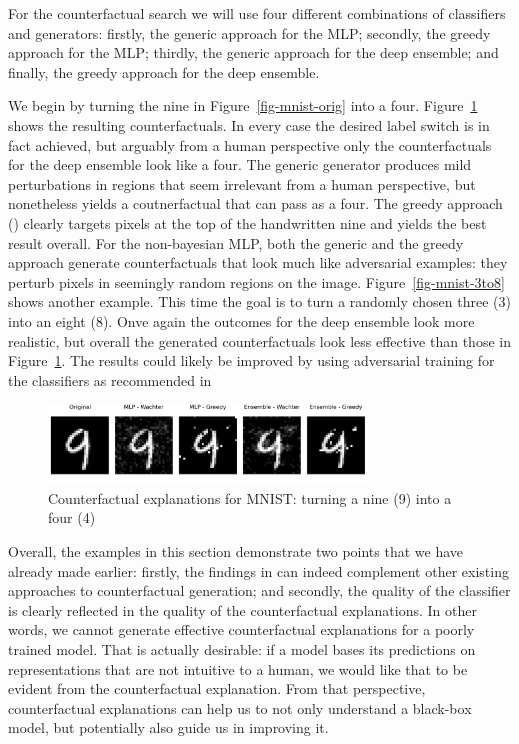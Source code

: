\documentclass{juliacon}
\begin{document}
For the counterfactual search we will use four different combinations of
classifiers and generators: firstly, the generic approach for the MLP;
secondly, the greedy approach for the MLP; thirdly, the generic approach
for the deep ensemble; and finally, the greedy approach for the deep
ensemble.

We begin by turning the nine in Figure~\ref{fig-mnist-orig} into a four.
Figure~\ref{fig-mnist-9to4} shows the resulting counterfactuals. In
every case the desired label switch is in fact achieved, but arguably
from a human perspective only the counterfactuals for the deep ensemble
look like a four. The generic generator produces mild perturbations in
regions that seem irrelevant from a human perspective, but nonetheless
yields a coutnerfactual that can pass as a four. The greedy approach
(\cite{wacther2021generating}) clearly targets pixels at the top of the
handwritten nine and yields the best result overall. For the
non-bayesian MLP, both the generic and the greedy approach generate
counterfactuals that look much like adversarial examples: they perturb
pixels in seemingly random regions on the image.
Figure~\ref{fig-mnist-3to8} shows another example. This time the goal is
to turn a randomly chosen three (3) into an eight (8). Onve again the
outcomes for the deep ensemble look more realistic, but overall the
generated counterfactuals look less effective than those in
Figure~\ref{fig-mnist-9to4}. The results could likely be improved by
using adversarial training for the classifiers as recommended in
\cite{wachter2021generating}

\begin{figure}

{\centering \includegraphics[width=3.33333in,height=0.83333in]{www/mnist_9_to_4.png}

}

\caption{\label{fig-mnist-9to4}Counterfactual explanations for MNIST:
turning a nine (9) into a four (4)}

\end{figure}

Overall, the examples in this section demonstrate two points that we
have already made earlier: firstly, the findings in
\cite{wachter2021generating} can indeed complement other existing
approaches to counterfactual generation; and secondly, the quality of
the classifier is clearly reflected in the quality of the counterfactual
explanations. In other words, we cannot generate effective
counterfactual explanations for a poorly trained model. That is actually
desirable: if a model bases its predictions on representations that are
not intuitive to a human, we would like that to be evident from the
counterfactual explanation. From that perspective, counterfactual
explanations can help us to not only understand a black-box model, but
potentially also guide us in improving it.
\end{document}
